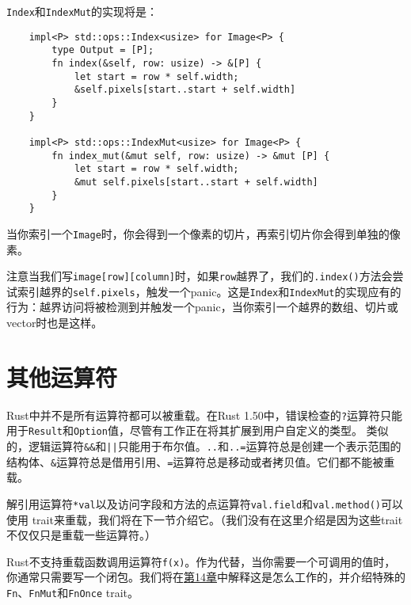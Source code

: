 \texttt{Index}和\texttt{IndexMut}的实现将是：
\begin{verbatim}
    impl<P> std::ops::Index<usize> for Image<P> {
        type Output = [P];
        fn index(&self, row: usize) -> &[P] {
            let start = row * self.width;
            &self.pixels[start..start + self.width]
        }
    }

    impl<P> std::ops::IndexMut<usize> for Image<P> {
        fn index_mut(&mut self, row: usize) -> &mut [P] {
            let start = row * self.width;
            &mut self.pixels[start..start + self.width]
        }
    }
\end{verbatim}

当你索引一个\texttt{Image}时，你会得到一个像素的切片，再索引切片你会得到单独的像素。

注意当我们写\texttt{image[row][column]}时，如果\texttt{row}越界了，我们的\texttt{.index()}方法会尝试索引越界的\texttt{self.pixels}，触发一个panic。这是\texttt{Index}和\texttt{IndexMut}的实现应有的行为：越界访问将被检测到并触发一个panic，当你索引一个越界的数组、切片或vector时也是这样。

\section{其他运算符}

Rust中并不是所有运算符都可以被重载。在Rust 1.50中，错误检查的\texttt{?}运算符只能用于\texttt{Result}和\texttt{Option}值，尽管有工作正在将其扩展到用户自定义的类型。 类似的，逻辑运算符\texttt{\&\&}和\texttt{||}只能用于布尔值。\texttt{..}和\texttt{..=}运算符总是创建一个表示范围的结构体、\texttt{\&}运算符总是借用引用、\texttt{=}运算符总是移动或者拷贝值。它们都不能被重载。

解引用运算符\texttt{*val}以及访问字段和方法的点运算符\texttt{val.field}和\texttt{val.method()}可以使用 trait来重载，我们将在下一节介绍它。（我们没有在这里介绍是因为这些trait不仅仅只是重载一些运算符。）

Rust不支持重载函数调用运算符\texttt{f(x)}。作为代替，当你需要一个可调用的值时，你通常只需要写一个闭包。我们将在\hyperref[ch14]{第14章}中解释这是怎么工作的，并介绍特殊的\texttt{Fn}、\texttt{FnMut}和\texttt{FnOnce} trait。
